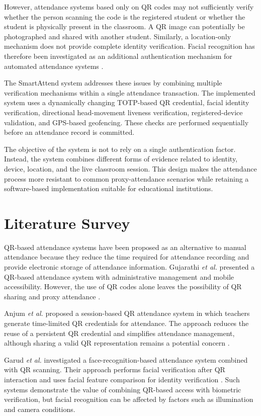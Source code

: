 \documentclass[conference]{IEEEtran}
\begin{document}
However, attendance systems based only on QR codes may not sufficiently verify whether the person scanning the code is the registered student or whether the student is physically present in the classroom. A QR image can potentially be photographed and shared with another student. Similarly, a location-only mechanism does not provide complete identity verification. Facial recognition has therefore been investigated as an additional authentication mechanism for automated attendance systems \cite{garud2025,tabassum2025}.

The SmartAttend system addresses these issues by combining multiple verification mechanisms within a single attendance transaction. The implemented system uses a dynamically changing TOTP-based QR credential, facial identity verification, directional head-movement liveness verification, registered-device validation, and GPS-based geofencing. These checks are performed sequentially before an attendance record is committed.

The objective of the system is not to rely on a single authentication factor. Instead, the system combines different forms of evidence related to identity, device, location, and the live classroom session. This design makes the attendance process more resistant to common proxy-attendance scenarios while retaining a software-based implementation suitable for educational institutions.


\section{Literature Survey}

QR-based attendance systems have been proposed as an alternative to manual attendance because they reduce the time required for attendance recording and provide electronic storage of attendance information. Gujarathi \textit{et al.} presented a QR-based attendance system with administrative management and mobile accessibility. However, the use of QR codes alone leaves the possibility of QR sharing and proxy attendance \cite{gujarathi2018}.

Anjum \textit{et al.} proposed a session-based QR attendance system in which teachers generate time-limited QR credentials for attendance. The approach reduces the reuse of a persistent QR credential and simplifies attendance management, although sharing a valid QR representation remains a potential concern \cite{anjum2023}.

Garud \textit{et al.} investigated a face-recognition-based attendance system combined with QR scanning. Their approach performs facial verification after QR interaction and uses facial feature comparison for identity verification \cite{garud2025}. Such systems demonstrate the value of combining QR-based access with biometric verification, but facial recognition can be affected by factors such as illumination and camera conditions.
\end{document}
